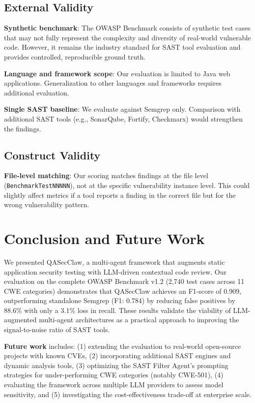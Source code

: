 \documentclass[conference]{IEEEtran}
\begin{document}
\subsection{External Validity}
\textbf{Synthetic benchmark}: The OWASP Benchmark consists of synthetic test cases that may not fully represent the complexity and diversity of real-world vulnerable code. However, it remains the industry standard for SAST tool evaluation and provides controlled, reproducible ground truth.

\textbf{Language and framework scope}: Our evaluation is limited to Java web applications. Generalization to other languages and frameworks requires additional evaluation.

\textbf{Single SAST baseline}: We evaluate against Semgrep only. Comparison with additional SAST tools (e.g., SonarQube, Fortify, Checkmarx) would strengthen the findings.

\subsection{Construct Validity}
\textbf{File-level matching}: Our scoring matches findings at the file level (\texttt{BenchmarkTestNNNNN}), not at the specific vulnerability instance level. This could slightly affect metrics if a tool reports a finding in the correct file but for the wrong vulnerability pattern.

\section{Conclusion and Future Work}
\label{sec:conclusion}

We presented QASecClaw, a multi-agent framework that augments static application security testing with LLM-driven contextual code review. Our evaluation on the complete OWASP Benchmark v1.2 (2,740 test cases across 11 CWE categories) demonstrates that QASecClaw achieves an F1-score of 0.909, outperforming standalone Semgrep (F1: 0.784) by reducing false positives by 88.6\% with only a 3.1\% loss in recall. These results validate the viability of LLM-augmented multi-agent architectures as a practical approach to improving the signal-to-noise ratio of SAST tools.

\textbf{Future work} includes: (1) extending the evaluation to real-world open-source projects with known CVEs, (2) incorporating additional SAST engines and dynamic analysis tools, (3) optimizing the SAST Filter Agent's prompting strategies for under-performing CWE categories (notably CWE-501), (4) evaluating the framework across multiple LLM providers to assess model sensitivity, and (5) investigating the cost-effectiveness trade-off at enterprise scale.
\end{document}
